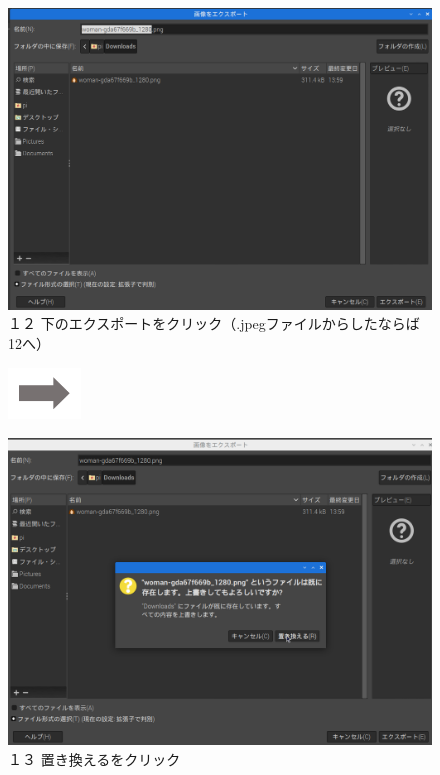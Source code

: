 \documentclass[a4paper,12pt]{jarticle}
\begin{document}
\begin{figure}
  \begin{minipage}{\textwidth}
    \begin{minipage}{0.45\textwidth}
      \includegraphics[width=\linewidth]{textbook-img137.png}\\
      １２
      下のエクスポートをクリック（.jpegファイルからしたならば12へ）
    \end{minipage}
    \includegraphics[width=1.919cm]{textbook-img135.png}
    \begin{minipage}{0.45\textwidth}
      \includegraphics[width=\linewidth]{textbook-img136.png}\\
      １３ 置き換えるをクリック
    \end{minipage}
  \end{minipage}


\end{figure}
\end{document}
